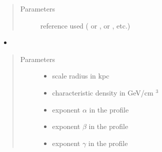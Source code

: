 \documentclass[letterpaper,10pt,english]{sphinxmanual}
\begin{document}
\begin{fulllineitems}
\begin{itemize}
\end{itemize}
\begin{quote}\begin{description}
\item[{Parameters}] \leavevmode
\sphinxAtStartPar
{} \textendash{} reference used ( or \sphinxcode{\sphinxupquote{\textquotesingle{}1309.2641\textquotesingle{}}},  or \sphinxcode{\sphinxupquote{\textquotesingle{}1408.0002\textquotesingle{}}}, etc.)

\end{description}\end{quote}
\begin{itemize}
\item {} 
\sphinxAtStartPar
{}

\end{itemize}
\begin{quote}\begin{description}
\item[{Parameters}] \leavevmode\begin{itemize}
\item {} 
\sphinxAtStartPar
{} \textendash{} scale radius in kpc

\item {} 
\sphinxAtStartPar
{} \textendash{} characteristic density in GeV/cm \({}^3\)

\item {} 
\sphinxAtStartPar
{} \textendash{} exponent \(\alpha\) in the {\hyperref[\detokenize{diffsph.profiles:diffsph.profiles.templates.hdz}]{}} profile

\item {} 
\sphinxAtStartPar
{} \textendash{} exponent \(\beta\) in the {\hyperref[\detokenize{diffsph.profiles:diffsph.profiles.templates.hdz}]{}} profile

\item {} 
\sphinxAtStartPar
{} \textendash{} exponent \(\gamma\) in the {\hyperref[\detokenize{diffsph.profiles:diffsph.profiles.templates.hdz}]{}} profile


\end{itemize}
\end{description}
\end{quote}
\end{fulllineitems}
\end{document}
